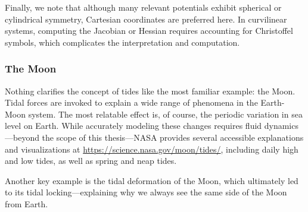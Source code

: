         Finally, we note that although many relevant potentials exhibit spherical or cylindrical symmetry, Cartesian coordinates are preferred here. In curvilinear systems, computing the Jacobian or Hessian requires accounting for Christoffel symbols, which complicates the interpretation and computation.


        
        \subsubsection*{The Moon}
            Nothing clarifies the concept of tides like the most familiar example: the Moon. Tidal forces are invoked to explain a wide range of phenomena in the Earth-Moon system. The most relatable effect is, of course, the periodic variation in sea level on Earth. While accurately modeling these changes requires fluid dynamics—beyond the scope of this thesis—NASA provides several accessible explanations and visualizations at \href{https://science.nasa.gov/moon/tides/}{https://science.nasa.gov/moon/tides/}, including daily high and low tides, as well as spring and neap tides.

            Another key example is the tidal deformation of the Moon, which ultimately led to its tidal locking—explaining why we always see the same side of the Moon from Earth.

